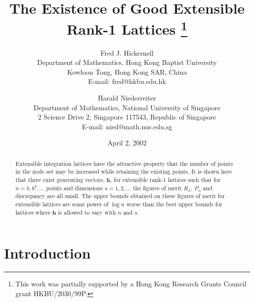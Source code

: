 \documentclass{article}
\renewcommand{\vec}[1]{\ensuremath{\mathbf{#1}}}
\newcommand{\h}{\vec h}
\begin{document}
                          
\title{The Existence of Good Extensible \\  Rank-1 Lattices
\thanks{This work was partially
supported by a Hong Kong Research Grants Council grant HKBU/2030/99P.}} 

\ifruninauthors
\else
\author{Fred J. Hickernell \\
Department of Mathematics, Hong Kong Baptist University \\ Kowloon
Tong, Hong Kong SAR, China
\\ E-mail: fred@hkbu.edu.hk
\and         %
 Harald Niederreiter \\
Department of Mathematics,
National University of Singapore \\ 
2 Science Drive 2,
Singapore 117543,
Republic of Singapore\\
E-mail: nied@math.nus.edu.sg
}
\fi



\date{April 2, 2002}

\maketitle

\begin{abstract}
{Extensible integration lattices have the attractive property that the
number of points in the node set may be increased while retaining the
existing points.  It is shown here that there exist generating
vectors, $\h$, for extensible rank-1 lattices such that for
$n=b, b^{2}, \ldots$ points and dimensions $s=1, 2, \ldots$ the
figures of merit $R_{\alpha}$, $P_{\alpha}$ and discrepancy are all
small.  The upper bounds obtained on these figures of merit for
extensible lattices are some power of $\log n$ worse than the best
upper bounds for lattices where $\h$ is allowed to vary with $n$ and
$s$.}
\end{abstract}




\section{Introduction}
\end{document}
